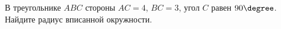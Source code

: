 \begin{ex}
	\begin{condition}
		В треугольнике \( ABC \) стороны \( AC = 4 \), \( BC = 3 \), угол \( C \) равен \( 90\degree\). Найдите радиус вписанной окружности.
	\end{condition}
\end{ex}